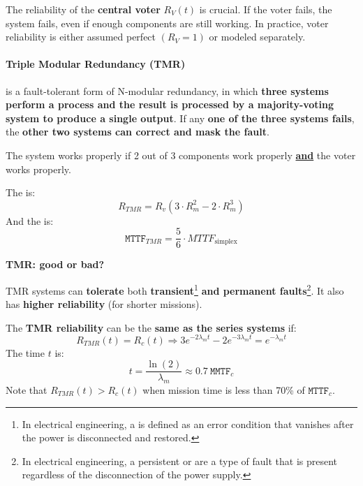 \noindent
The reliability of the \textbf{central voter} $R_{V}(t)$ is crucial. If the voter fails, the system fails, even if enough components are still working. In practice, voter reliability is either assumed perfect $\left(R_{V} = 1\right)$ or modeled separately.

\newpage

\paragraph{Triple Modular Redundancy (TMR)}

 is a fault-tolerant form of N-modular redundancy, in which \textbf{three systems perform a process and the result is processed by a majority-voting system to produce a single output}. If any \textbf{one of the three systems fails}, the \textbf{other two systems can correct and mask the fault}.

\highspace
The system works properly if 2 out of 3 components work properly \textbf{\underline{and}} the voter works properly.

\highspace
The  is:
\begin{equation}
	R_{TMR} = R_{v}\left(3 \cdot R_{m}^{2} - 2 \cdot R_{m}^{3}\right)
\end{equation}
And the  is:
\begin{equation}
	\texttt{MTTF}_{TMR} = \dfrac{5}{6} \cdot MTTF_{\text{simplex}}
\end{equation}

\begin{flushleft}
	\textcolor{Green3}{ \textbf{TMR: good or bad?}}
\end{flushleft}
TMR systems can \textbf{tolerate} both \textbf{transient}\footnote{In electrical engineering, a  is defined as an error condition that vanishes after the power is disconnected and restored.} \textbf{and permanent faults}\footnote{In electrical engineering, a persistent or  are a type of fault that is present regardless of the disconnection of the power supply.}. It also has \textbf{higher reliability} (for shorter missions).

\highspace
The \textbf{TMR reliability} can be the \textbf{same as the series systems} if:
\begin{equation}
	R_{TMR}\left(t\right) = R_{c}\left(t\right) \Longrightarrow 3e^{-2 \lambda_{m} t} - 2e^{-3 \lambda_{m} t} = e^{-\lambda_{m} t}
\end{equation}
The time $t$ is:
\begin{equation}
	t = \dfrac{\ln\left(2\right)}{\lambda_{m}} \approx 0.7 \: \texttt{MMTF}_{c}
\end{equation}
Note that $R_{TMR}\left(t\right) > R_{c}\left(t\right)$ when mission time is less than 70\% of $\texttt{MTTF}_{c}$.

